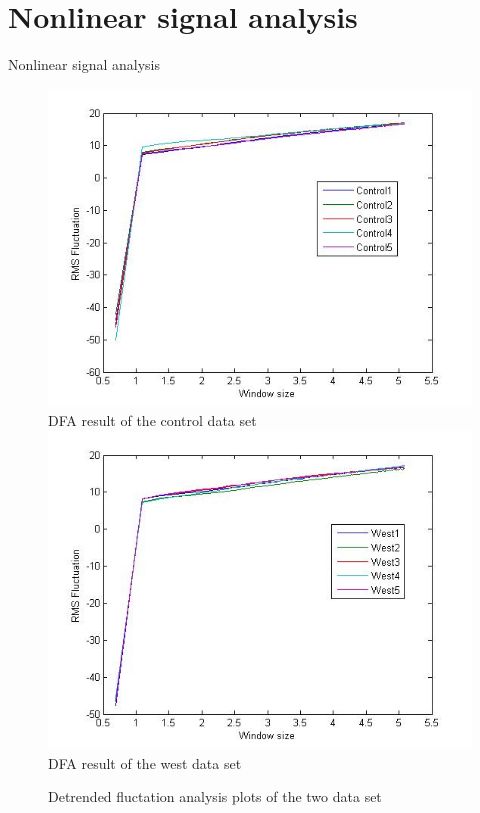 \documentclass[t,12pt,english
\ifx\beamermode\undefined\else,\beamermode\fi
]{beamer}
\begin{document}
    
    
    

\section{Nonlinear signal analysis}\label{Second-section}    
    
\begin{frame}{Nonlinear signal analysis}

\begin{figure}[!htbp]
%
\centering
\includegraphics[width=.8\textwidth]{E1.jpg}\\
\tiny{DFA result of the control data set}\label{figa}
\endminipage\hfill
{}%
\centering
\includegraphics[width=.8\textwidth]{E2.jpg}\\
\tiny{DFA result of the west data set}\label{figb}
\endminipage\hfill
\caption{\tiny Detrended fluctation analysis plots of the two data set}
\end{figure}
   
\end{frame}    
    
\end{document}
